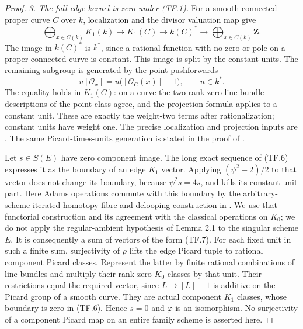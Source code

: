 \begin{proof}
\emph{3. The full edge kernel is zero under (TF.1).}
For a smooth connected proper curve $C$ over $k$, localization and
the divisor valuation map give
\[
 \bigoplus_{x\in C(k)}K_1(k)\longrightarrow K_1(C)
 \longrightarrow k(C)^*\longrightarrow
                       \bigoplus_{x\in C(k)}\mathbf Z .
\]
The image in $k(C)^*$ is $k^*$, since a rational function with no
zero or pole on a proper connected curve is constant. This image
is split by the constant units. The remaining subgroup is generated
by the point pushforwards
\[
          u[\mathcal O_x]=u\bigl([\mathcal O_C(x)]-1\bigr),
                         \qquad u\in k^*.
                                                               \tag{TF.7}
\]
The equality holds in $K_1(C)$: on a curve the two rank-zero
line-bundle descriptions of the point class agree, and the
projection formula applies to a constant unit.
These are exactly the weight-two terms after rationalization;
constant units have weight one.
The precise localization and projection inputs are
\citet[Section 7, Propositions 2.10 and 3.2, equation (3.3),
original pp.~126--127]{rootQuillen1973}.
The same Picard-times-units generation is stated in the proof of
\citet[Lemma 5.2, pp.~395--396]{D_PedriniWeibel1994}.

Let $s\in S(E)$ have zero component image. The long exact sequence
of (TF.6) expresses it as the boundary of an edge $K_1$ vector.
Applying $(\psi^2-2)/2$ to that vector does not change its boundary,
because $\psi^2s=4s$, and kills its constant-unit part.
Here Adams operations commute with this boundary by the
arbitrary-scheme iterated-homotopy-fibre and delooping construction
in \citet[p.~258, paragraph preceding Lemma 2.1]{frC3bcLevine1994}.
We use that functorial construction and its agreement with the
classical operations on $K_0$; we do not apply the regular-ambient
hypothesis of Lemma 2.1 to the singular scheme $E$.
It is consequently a sum of vectors of the form (TF.7).
For each fixed unit in such a finite sum, surjectivity of $\rho$
lifts the edge Picard tuple to rational component Picard classes.
Represent the latter by finite rational combinations of line bundles
and multiply their rank-zero $K_0$ classes by that unit.
Their restrictions equal the required vector, since
$L\mapsto[L]-1$ is additive on the Picard group of a smooth curve.
They are actual component $K_1$ classes, whose boundary is zero
in (TF.6). Hence $s=0$ and $\varphi$ is an isomorphism.
No surjectivity of a component Picard map on an entire family
scheme is asserted here.


\end{proof}
